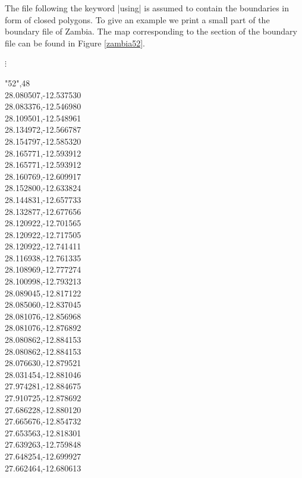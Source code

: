 \documentclass[a4paper]{article}
\begin{document}
The file following the keyword |using| is assumed to contain the boundaries in form of closed polygons. To give an example we
print a small part of the boundary file of Zambia. The map corresponding to the section of the boundary file can be found in
Figure \ref{zambia52}.

\footnotesize

\hspace{1cm}  $\vdots$

 "52",48\\
 28.080507,-12.537530\\
 28.083376,-12.546980\\
 28.109501,-12.548961\\
 28.134972,-12.566787\\
 28.154797,-12.585320\\
 28.165771,-12.593912\\
 28.165771,-12.593912\\
 28.160769,-12.609917\\
 28.152800,-12.633824\\
 28.144831,-12.657733\\
 28.132877,-12.677656\\
 28.120922,-12.701565\\
 28.120922,-12.717505\\
 28.120922,-12.741411\\
 28.116938,-12.761335\\
 28.108969,-12.777274\\
 28.100998,-12.793213\\
 28.089045,-12.817122\\
 28.085060,-12.837045\\
 28.081076,-12.856968\\
 28.081076,-12.876892\\
 28.080862,-12.884153\\
 28.080862,-12.884153\\
 28.076630,-12.879521\\
 28.031454,-12.881046\\
 27.974281,-12.884675\\
 27.910725,-12.878692\\
 27.686228,-12.880120\\
 27.665676,-12.854732\\
 27.653563,-12.818301\\
 27.639263,-12.759848\\
 27.648254,-12.699927\\
 27.662464,-12.680613\\
\end{document}
